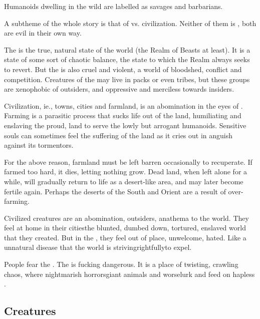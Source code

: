 Humanoids dwelling in the wild are labelled as savages and barbarians. 

A subtheme of the whole story is that of \Wylde{} vs. civilization. Neither of them is , both are evil in their own way. 

The \Wylde{} is the true, natural state of the world (the Realm of Beasts at least). 
It is a state of some sort of chaotic balance, the state to which the Realm always seeks to revert. 
But the \Wylde{} is also cruel and violent, a world of bloodshed, conflict and competition. 
Creatures of the \Wylde{} may live in packs or even tribes, but these groups are xenophobic of outsiders, and oppressive and merciless towards insiders. 

Civilization, ie., towns, cities and farmland, is an abomination in the eyes of . 
Farming is a parasitic process that sucks life out of the land, humiliating and enslaving the proud, \Wylde{} land to serve the lowly but arrogant humanoids. 
Sensitive souls can sometimes feel the suffering of the land as it cries out in anguish against its tormentors. 

For the above reason, farmland must be left barren occasionally to recuperate. 
If farmed too hard, it dies, letting nothing grow. 
Dead land, when left alone for a while, will gradually return to life as a \Wylde{} desert-like area, and may later become fertile again. 
Perhaps the deserts of the South and Orient are a result of over-farming. 

Civilized creatures are an abomination, outsiders, anathema to the world. 
They feel at home in their cities\dash the blunted, dumbed down, tortured, enslaved world that they created. 
But in the \Wylde{}, they feel out of place, unwelcome, hated. 
Like a unnatural disease that the world is striving\dash rightfully\dash to expel.

People fear the \wylde.
The \wylde is fucking dangerous.
It is a place of twisting, crawling chaos, where nightmarish horrors\dash{}giant animals and worse\dash{}lurk and feed on hapless \travelers.









\subsection{Creatures}





